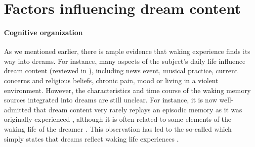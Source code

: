 \section{Factors influencing dream content}
\label{sec:dream-content:factors}


\paragraph{Cognitive organization}

As we mentioned earlier, there is ample evidence that waking experience finds its way into dreams. For instance, many aspects of the subject’s daily life influence dream content (reviewed in \citealp{ruby_experimental_2011}), including news event, musical practice, current concerns and religious beliefs, chronic pain, mood or living in a violent environment. However, the characteristics and time course of the waking memory sources integrated into dreams are still unclear. For instance, it is now well-admitted that dream content very rarely replays an episodic memory as it was originally experienced \citep{fosse_dreaming_2003, nielsen_what_2005}, although it is often related to some elements of the waking life of the dreamer \citep{schredl_characteristics_2010, blagrove_trait_2010, ruby_experimental_2011}. This observation has led to the so-called  which simply states that dreams reflect waking life experiences \citep{schredl_continuity_2003}.

